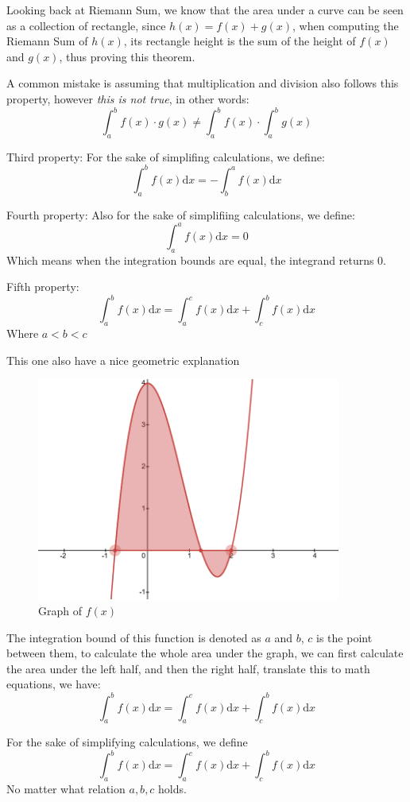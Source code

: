 \documentclass{article}
\begin{document}
Looking back at Riemann Sum, we know that the area under a curve can be seen as a collection of rectangle, since $h(x) = f(x) + g(x)$,
when computing the Riemann Sum of $h(x)$, its rectangle height is the sum of the height of $f(x)$ and $g(x)$, thus proving this theorem.

A common mistake is assuming that multiplication and division also follows this property, however \emph{this is not true}, in other words:
\[
\int_{a}^{b} f(x)\cdot g(x) \neq \int_{a}^{b} f(x) \cdot \int_{a}^{b}g(x)
\]

Third property:
For the sake of simplifing calculations, we define:
\[
\int_{a}^{b} f(x) \mathrm{d}x = -\int_{b}^{a} f(x) \mathrm{d}x
\]

Fourth property:
Also for the sake of simplifiing calculations, we define:
\[
\int_{a}^{a} f(x) \mathrm{d}x = 0
\]
Which means when the integration bounds are equal, the integrand returns 0.

Fifth property:
\[
\int_{a}^{b} f(x) \mathrm{d}x = \int_{a}^{c} f(x) \mathrm{d}x + \int_{c}^{b} f(x) \mathrm{d}x 
\]
Where $a<b<c$

This one also have a nice geometric explanation
\begin{figure}[H]
    \includegraphics[width = 10cm]{interval.png}
    \centering
    \caption{Graph of $f(x)$}
\end{figure}
The integration bound of this function is denoted as $a$ and $b$, $c$ is the point between them,
to calculate the whole area under the graph, we can first calculate the area under the left half, and then the right half,
translate this to math equations, we have:
\[
\int_{a}^{b} f(x) \mathrm{d}x = \int_{a}^{c} f(x) \mathrm{d}x + \int_{c}^{b} f(x) \mathrm{d}x 
\]

For the sake of simplifying calculations, we define 
\[
\int_{a}^{b} f(x) \mathrm{d}x = \int_{a}^{c} f(x)\mathrm{d}x + \int_{c}^{b} f(x)\mathrm{d}x
\]
No matter what relation $a,b,c$ holds.
\end{document}

